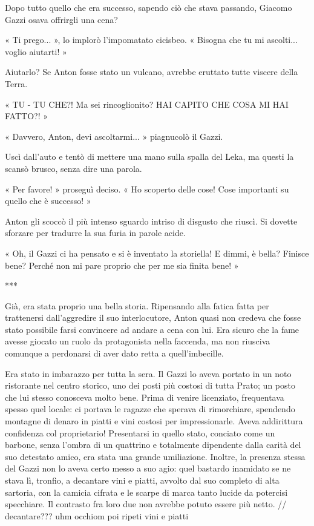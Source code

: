 Dopo tutto quello che era successo, sapendo ciò che stava passando, Giacomo Gazzi osava offrirgli una cena?

« Ti prego... », lo implorò l'impomatato cicisbeo. « Bisogna che tu mi ascolti... voglio aiutarti! »

Aiutarlo? Se Anton fosse stato un vulcano, avrebbe eruttato tutte viscere della Terra.

« TU - TU CHE?! Ma sei rincoglionito? HAI CAPITO CHE COSA MI HAI FATTO?! »

« Davvero, Anton, devi ascoltarmi... » piagnucolò il Gazzi.

Uscì dall'auto e tentò di mettere una mano sulla spalla del Leka, ma questi la scansò brusco, senza dire una parola.

« Per favore! » proseguì deciso. « Ho scoperto delle cose! Cose importanti su quello che è successo! »

Anton gli scoccò il più intenso sguardo intriso di disgusto che riuscì. Si dovette sforzare per tradurre la sua furia in parole acide.

« Oh, il Gazzi ci ha pensato e si è inventato la storiella! E dimmi, è bella? Finisce bene? Perché non mi pare proprio che per me sia finita bene! »

***

Già, era stata proprio una bella storia. Ripensando alla fatica fatta per trattenersi dall'aggredire il suo interlocutore, Anton quasi non credeva che fosse stato possibile farsi convincere ad andare a cena con lui. Era sicuro che la fame avesse giocato un ruolo da protagonista nella faccenda, ma non riusciva comunque a perdonarsi di aver dato retta a quell'imbecille.

Era stato in imbarazzo per tutta la sera. Il Gazzi lo aveva portato in un noto ristorante nel centro storico, uno dei posti più costosi di tutta Prato; un posto che lui stesso conosceva molto bene. Prima di venire licenziato, frequentava spesso quel locale: ci portava le ragazze che sperava di rimorchiare, spendendo montagne di denaro in piatti e vini costosi per impressionarle. Aveva addirittura confidenza col proprietario! Presentarsi in quello stato, conciato come un barbone, senza l'ombra di un quattrino e totalmente dipendente dalla carità del suo detestato amico, era stata una grande umiliazione. Inoltre, la presenza stessa del Gazzi non lo aveva certo messo a suo agio: quel bastardo inamidato se ne stava lì, tronfio, a decantare vini e piatti, avvolto dal suo completo di alta sartoria, con la camicia cifrata e le scarpe di marca tanto lucide da potercisi specchiare. Il contrasto fra loro due non avrebbe potuto essere più netto. // decantare??? uhm occhiom poi ripeti vini e piatti

